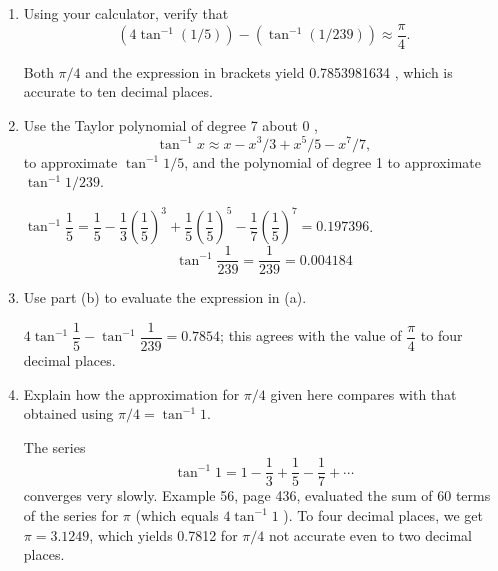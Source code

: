 \question
\begin{enumerate}
\renewcommand{\labelenumi}{(\alph{enumi})}
\item Using your calculator, verify that
\[
\left(4 \tan ^{-1}(1 / 5)\right)-\left(\tan ^{-1}(1 / 239)\right) \approx \dfrac{\pi}{4} .
\]
\begin{solutionorbox}[1in]
Both $\pi / 4$ and the expression in brackets yield 0.7853981634 , which is accurate to ten decimal places.
\end{solutionorbox}
\item Use the Taylor polynomial of degree 7 about 0 ,
\[
\tan ^{-1} x \approx x-x^{3} / 3+x^{5} / 5-x^{7} / 7,
\]
to approximate $\tan ^{-1} 1 / 5$, and the polynomial of degree 1 to approximate $\tan ^{-1} 1 / 239$.
\begin{solutionorbox}[1.5in]
$\tan ^{-1} \dfrac{1}{5}=\dfrac{1}{5}-\dfrac{1}{3}\left(\dfrac{1}{5}\right)^{3}+\dfrac{1}{5}\left(\dfrac{1}{5}\right)^{5}-\dfrac{1}{7}\left(\dfrac{1}{5}\right)^{7}=0.197396$.
\[
\tan ^{-1} \dfrac{1}{239}=\dfrac{1}{239}=0.004184
\]
\end{solutionorbox}
\item Use part (b) to evaluate the expression in (a).
\begin{solutionorbox}[1.5in]
$4 \tan ^{-1} \dfrac{1}{5}-\tan ^{-1} \dfrac{1}{239}=0.7854$; this agrees with the value of $\dfrac{\pi}{4}$ to four decimal places.
\end{solutionorbox}

\item Explain how the approximation for $\pi / 4$ given here compares with that obtained using $\pi / 4=\tan ^{-1} 1$.
\begin{solutionorbox}[1.5in]
The series
\[
\tan ^{-1} 1=1-\dfrac{1}{3}+\dfrac{1}{5}-\dfrac{1}{7}+\cdots
\]
converges very slowly. Example 56, page 436, evaluated the sum of 60 terms of the series for $\pi$ (which equals $4 \tan ^{-1} 1$ ). To four decimal places, we get $\pi=3.1249$, which yields 0.7812 for $\pi / 4$ not accurate even to two decimal places.
\end{solutionorbox}
\end{enumerate}





\newpage





